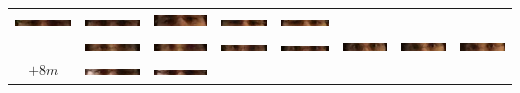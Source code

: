 \begin{tabular}{|c|c|c|c|c|c|c|c|}
\includegraphics[width=0.115\linewidth]{Auge1/A_Img9-3FalkoE.png} &
\includegraphics[width=0.115\linewidth]{Auge1/A_Img9-4FalkoE.png} &
\includegraphics[width=0.115\linewidth]{Auge1/A_Img9-5FalkoE.png} &
\includegraphics[width=0.115\linewidth]{Auge1/A_Img9-6FalkoE.png} &
\includegraphics[width=0.115\linewidth]{Auge1/A_Img9-7FalkoE.png} \\&
\includegraphics[width=0.115\linewidth]{Auge1/A_Img9-1ThomasE.png} &
\includegraphics[width=0.115\linewidth]{Auge1/A_Img9-2ThomasE.png} &
\includegraphics[width=0.115\linewidth]{Auge1/A_Img9-3ThomasE.png} &
\includegraphics[width=0.115\linewidth]{Auge1/A_Img9-4ThomasE.png} &
\includegraphics[width=0.115\linewidth]{Auge1/A_Img9-5ThomasE.png} &
\includegraphics[width=0.115\linewidth]{Auge1/A_Img9-6ThomasE.png} &
\includegraphics[width=0.115\linewidth]{Auge1/A_Img9-7ThomasE.png} \\\hline 
$+8m$&
\includegraphics[width=0.115\linewidth]{Auge1/A_Img8-1FalkoE.png} &
\includegraphics[width=0.115\linewidth]{Auge1/A_Img8-2FalkoE.png} &

\end{tabular}

